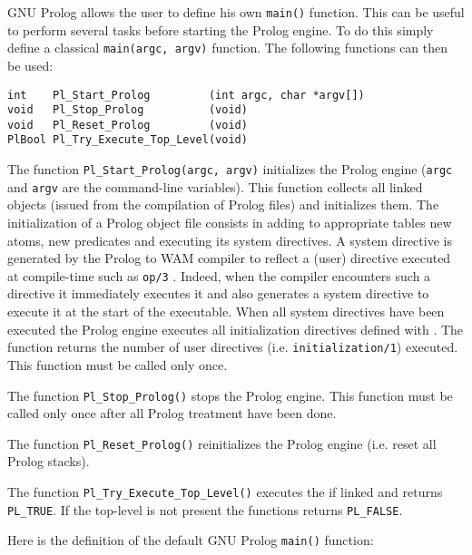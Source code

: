 GNU Prolog allows the user to define his own \texttt{main()}
function. This can be useful to perform several tasks before starting
the Prolog engine. To do this simply define a classical
\texttt{main(argc, argv)} function. The following functions can then be used:

\begin{Indentation}
\begin{verbatim}
int    Pl_Start_Prolog         (int argc, char *argv[])
void   Pl_Stop_Prolog          (void)
void   Pl_Reset_Prolog         (void)
PlBool Pl_Try_Execute_Top_Level(void)
\end{verbatim}
\end{Indentation}

The function \texttt{Pl\_Start\_Prolog(argc, argv)} initializes the Prolog
engine (\texttt{argc} and \texttt{argv} are the command-line variables). This
function collects all linked objects (issued from the compilation of Prolog
files) and initializes them. The initialization of a Prolog object file
consists in adding to appropriate tables new atoms, new predicates and
executing its system directives. A system directive is generated by the
Prolog to WAM compiler to reflect a (user) directive executed at compile-time
such as \texttt{op/3} . Indeed, when the compiler encounters such
a directive it immediately executes it and also generates a system directive
to execute it at the start of the executable.  When all system directives
have been executed the Prolog engine executes all initialization directives
defined with 
. The function returns the number of user
directives (i.e. \texttt{initialization/1}) executed. This function must be
called only once.

The function \texttt{Pl\_Stop\_Prolog()} stops the Prolog engine. This function
must be called only once after all Prolog treatment have been done.

The function \texttt{Pl\_Reset\_Prolog()} reinitializes the Prolog engine
(i.e. reset all Prolog stacks).

The function \texttt{Pl\_Try\_Execute\_Top\_Level()} executes the
 if linked  and returns
\texttt{PL\_TRUE}. If the top-level is not present the functions returns
\texttt{PL\_FALSE}.

Here is the definition of the default GNU Prolog \texttt{main()} function:

